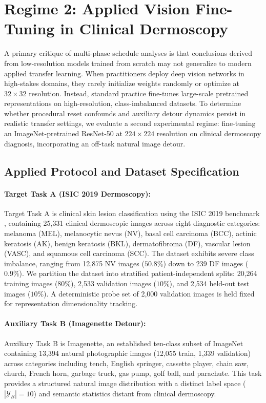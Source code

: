 \documentclass[sn-mathphys,Numbered]{sn-jnl}
\begin{document}
\section{Regime 2: Applied Vision Fine-Tuning in Clinical Dermoscopy}\label{sec:applied_finetuning}

A primary critique of multi-phase schedule analyses is that conclusions derived from low-resolution models trained from scratch may not generalize to modern applied transfer learning. When practitioners deploy deep vision networks in high-stakes domains, they rarely initialize weights randomly or optimize at $32 \times 32$ resolution. Instead, standard practice fine-tunes large-scale pretrained representations on high-resolution, class-imbalanced datasets. To determine whether procedural reset confounds and auxiliary detour dynamics persist in realistic transfer settings, we evaluate a second experimental regime: fine-tuning an ImageNet-pretrained ResNet-50 at $224 \times 224$ resolution on clinical dermoscopy diagnosis, incorporating an off-task natural image detour.

\subsection{Applied Protocol and Dataset Specification}\label{subsec:applied_protocol}

\paragraph{Target Task A (ISIC 2019 Dermoscopy):}
Target Task A is clinical skin lesion classification using the ISIC 2019 benchmark \cite{codella2018skin,tschandl2018ham10000}, containing 25,331 clinical dermoscopic images across eight diagnostic categories: melanoma (MEL), melanocytic nevus (NV), basal cell carcinoma (BCC), actinic keratosis (AK), benign keratosis (BKL), dermatofibroma (DF), vascular lesion (VASC), and squamous cell carcinoma (SCC). The dataset exhibits severe class imbalance, ranging from 12,875 NV images ($50.8\%$) down to 239 DF images ($0.9\%$). We partition the dataset into stratified patient-independent splits: 20,264 training images ($80\%$), 2,533 validation images ($10\%$), and 2,534 held-out test images ($10\%$). A deterministic probe set of 2,000 validation images is held fixed for representation dimensionality tracking.

\paragraph{Auxiliary Task B (Imagenette Detour):}
Auxiliary Task B is Imagenette, an established ten-class subset of ImageNet \cite{howard2020fastai} containing 13,394 natural photographic images (12,055 train, 1,339 validation) across categories including tench, English springer, cassette player, chain saw, church, French horn, garbage truck, gas pump, golf ball, and parachute. This task provides a structured natural image distribution with a distinct label space ($|\mathcal{Y}_B| = 10$) and semantic statistics distant from clinical dermoscopy.
\end{document}
